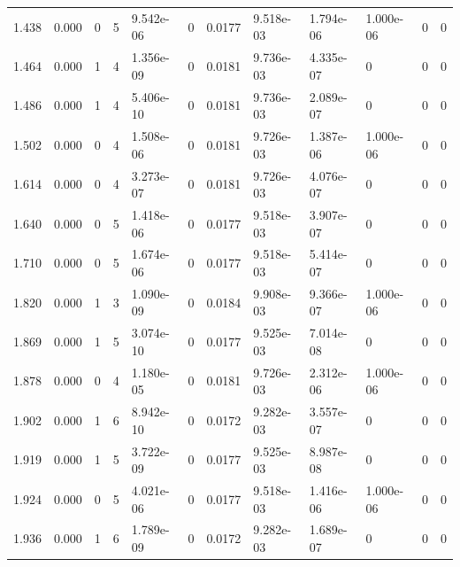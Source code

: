 \documentclass[preview]{standalone}
\begin{document}
{{\begin{tabular}{L{1.2cm}C{1.2cm} C{0.3cm}C{0.5cm} C{1.4cm}C{1.4cm} C{1.4cm}C{1.4cm} C{1.6cm}C{1.6cm} C{1.6cm}C{1.6cm}}
  1.438  &  0.000  & 0     &  5 &  9.542e-06  & 0  &  0.0177&   9.518e-03& 1.794e-06 & 1.000e-06   &  0 & 0  \\ 
  1.464  &  0.000  & 1     &  4 &  1.356e-09  & 0  &  0.0181&   9.736e-03& 4.335e-07 & 0   &  0 & 0  \\ 
  1.486  &  0.000  & 1     &  4 &  5.406e-10  & 0  &  0.0181&   9.736e-03& 2.089e-07 & 0   &  0 & 0  \\ 
  1.502  &  0.000  & 0     &  4 &  1.508e-06  & 0  &  0.0181&   9.726e-03& 1.387e-06 & 1.000e-06   &  0 & 0  \\ 
  1.614  &  0.000  & 0     &  4 &  3.273e-07  & 0  &  0.0181&   9.726e-03& 4.076e-07 & 0   &  0 & 0  \\ 
  1.640  &  0.000  & 0     &  5 &  1.418e-06  & 0  &  0.0177&   9.518e-03& 3.907e-07 & 0   &  0 & 0  \\ 
  1.710  &  0.000  & 0     &  5 &  1.674e-06  & 0  &  0.0177&   9.518e-03& 5.414e-07 & 0   &  0 & 0  \\ 
  1.820  &  0.000  & 1     &  3 &  1.090e-09  & 0  &  0.0184&   9.908e-03& 9.366e-07 & 1.000e-06   &  0 & 0  \\ 
  1.869  &  0.000  & 1     &  5 &  3.074e-10  & 0  &  0.0177&   9.525e-03& 7.014e-08 & 0   &  0 & 0  \\ 
  1.878  &  0.000  & 0     &  4 &  1.180e-05  & 0  &  0.0181&   9.726e-03& 2.312e-06 & 1.000e-06   &  0 & 0  \\ 
  1.902  &  0.000  & 1     &  6 &  8.942e-10  & 0  &  0.0172&   9.282e-03& 3.557e-07 & 0   &  0 & 0  \\ 
  1.919  &  0.000  & 1     &  5 &  3.722e-09  & 0  &  0.0177&   9.525e-03& 8.987e-08 & 0   &  0 & 0  \\ 
  1.924  &  0.000  & 0     &  5 &  4.021e-06  & 0  &  0.0177&   9.518e-03& 1.416e-06 & 1.000e-06   &  0 & 0  \\ 
  1.936  &  0.000  & 1     &  6 &  1.789e-09  & 0  &  0.0172&   9.282e-03& 1.689e-07 & 0   &  0 & 0  \\ 
\hline 
\end{tabular} 

}}
\end{document}

